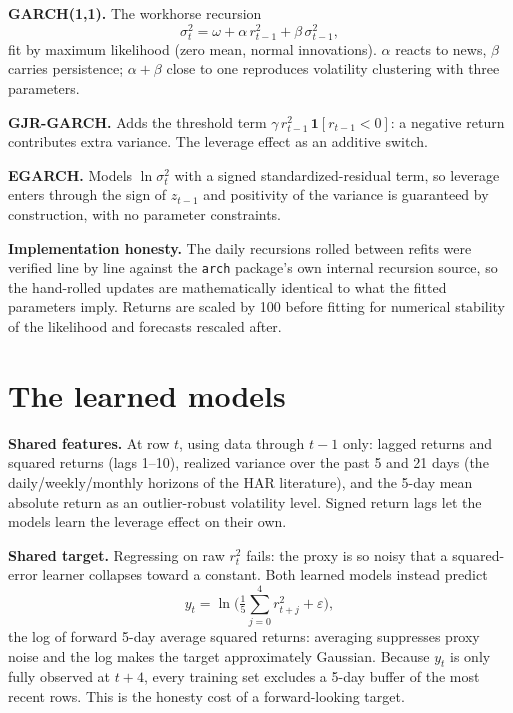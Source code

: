 \documentclass[a4paper,11pt]{article}
\newcommand{\term}[1]{\textbf{#1}}
\begin{document}
\term{GARCH(1,1).} The workhorse recursion
\begin{equation}
\sigma_t^2=\omega+\alpha\,r_{t-1}^2+\beta\,\sigma_{t-1}^2,
\label{eq:garch}
\end{equation}
fit by maximum likelihood (zero mean, normal innovations). $\alpha$ reacts to news, $\beta$ carries persistence; $\alpha+\beta$ close to one reproduces volatility clustering with three parameters.

\term{GJR-GARCH.} Adds the threshold term $\gamma\,r_{t-1}^2\,\mathbf{1}[r_{t-1}<0]$: a negative return contributes extra variance. The leverage effect as an additive switch.

\term{EGARCH.} Models $\ln\sigma_t^2$ with a signed standardized-residual term, so leverage enters through the sign of $z_{t-1}$ and positivity of the variance is guaranteed by construction, with no parameter constraints.

\term{Implementation honesty.} The daily recursions rolled between refits were verified line by line against the \texttt{arch} package's own internal recursion source, so the hand-rolled updates are mathematically identical to what the fitted parameters imply. Returns are scaled by 100 before fitting for numerical stability of the likelihood and forecasts rescaled after.

\section{The learned models}

\term{Shared features.} At row $t$, using data through $t-1$ only: lagged returns and squared returns (lags 1--10), realized variance over the past 5 and 21 days (the daily/weekly/monthly horizons of the HAR literature), and the 5-day mean absolute return as an outlier-robust volatility level. Signed return lags let the models learn the leverage effect on their own.

\term{Shared target.} Regressing on raw $r_t^2$ fails: the proxy is so noisy that a squared-error learner collapses toward a constant. Both learned models instead predict
\begin{equation}
y_t=\ln\Big(\tfrac{1}{5}\textstyle\sum_{j=0}^{4}r_{t+j}^2+\varepsilon\Big),
\label{eq:target}
\end{equation}
the log of forward 5-day average squared returns: averaging suppresses proxy noise and the log makes the target approximately Gaussian. Because $y_t$ is only fully observed at $t+4$, every training set excludes a 5-day buffer of the most recent rows. This is the honesty cost of a forward-looking target.
\end{document}
